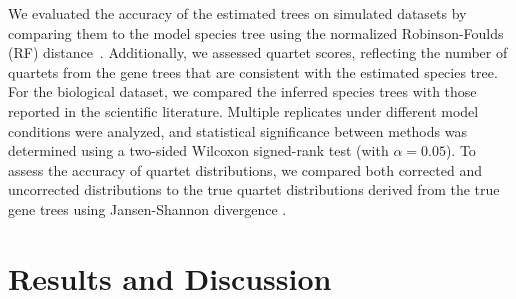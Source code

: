 \documentclass[10pt,a4paper]{article}
\begin{document}
We evaluated the accuracy of the estimated trees on simulated datasets by comparing them to the model species tree using the normalized Robinson-Foulds (RF) distance~\cite{robinson_comparison_1981}.%
Additionally, we assessed quartet scores, reflecting the number of quartets from the gene trees that are consistent with the estimated species tree. %
For the biological dataset, we compared the inferred species trees with those reported in the scientific literature. Multiple replicates under different model conditions were analyzed, and statistical significance between methods was determined using a two-sided Wilcoxon signed-rank test (with $\alpha = 0.05$). To assess the accuracy of quartet distributions, we compared both corrected and uncorrected distributions to the true quartet distributions derived from the true gene trees using Jansen-Shannon divergence \cite{fuglede2004jensen}.


\section{Results and Discussion}
\end{document}
